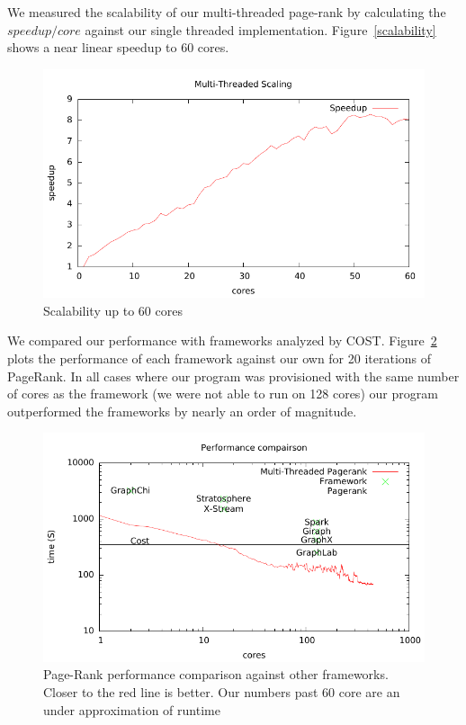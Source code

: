 We measured the scalability of our multi-threaded page-rank by
calculating the $speedup / core$ against our single threaded
implementation. Figure~\ref{scalability} shows a near linear speedup
to 60 cores.

\begin{figure}[h]
\includegraphics[width=\linewidth]{"fig/scale"}
\caption{Scalability up to 60 cores}
\label{fig:scalability}
\end{figure}


We compared our performance with frameworks analyzed by COST.
Figure~\ref{fig:page-rank-compairison} plots the performance of each
framework against our own for 20 iterations of PageRank. In all cases
where our program was provisioned with the same number of cores as the
framework (we were not able to run on 128 cores) our program
outperformed the frameworks by nearly an order of magnitude.

\begin{figure}[h]
\includegraphics[width=\linewidth]{"fig/page_rank_compairison"}
\caption{Page-Rank performance comparison against other frameworks. Closer to the red line is better. Our numbers past 60 core are an under approximation of runtime}
\label{fig:page-rank-compairison}
\end{figure}

